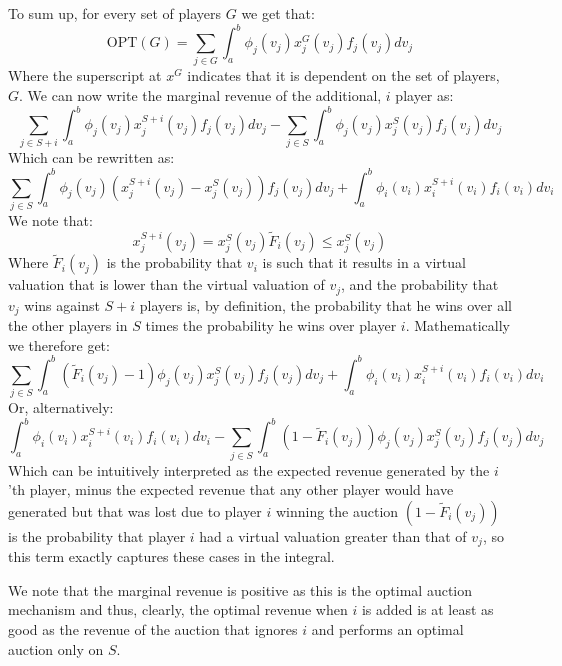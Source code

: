 \documentclass[a4page,notitlepage]{article}
\begin{document}
\begin{enumerate}
  To sum up, for every set of players $G$ we get that:
  \begin{equation*}
    \text{OPT}(G)=\sum_{j\in G}\int_a^b\phi_j(v_j)x_j^G(v_j)f_j(v_j)dv_j
  \end{equation*}
  Where the superscript at $x^G$ indicates that it is dependent on the set of players, $G$.
  We can now write the marginal revenue of the additional, $i$ player as:
  \begin{equation*}
    \sum_{j\in S+{i}}\int_a^b\phi_j(v_j)x_j^{S+{i}}(v_j)f_j(v_j)dv_j-\sum_{j\in S}\int_a^b\phi_j(v_j)x_j^S(v_j)f_j(v_j)dv_j 
  \end{equation*}
  Which can be rewritten as:
  \begin{equation*}
    \sum_{j\in S}\int_a^b\phi_j(v_j)(x_j^{S+{i}}(v_j)-x_j^S(v_j))f_j(v_j)dv_j + \int_a^b\phi_i(v_i)x_i^{S+{i}}(v_i)f_i(v_i)dv_i
  \end{equation*}
  We note that:
  \begin{equation*}
    x_j^{S+i}(v_j)=x_j^S(v_j)\tilde F_i(v_j)\leq x_j^S(v_j)
  \end{equation*}
  Where $\tilde F_i(v_j)$ is the probability that $v_i$ is such that it results in a virtual valuation that is lower than the virtual valuation of $v_j$, and the probability that $v_j$ wins against $S+i$ players is, by definition, the probability that he wins over all the other players in $S$ times the probability he wins over player $i$.
  Mathematically we therefore get:
  \begin{equation*}
    \sum_{j\in S}\int_a^b(\tilde{F}_i(v_j)-1)\phi_j(v_j)x_j^S(v_j)f_j(v_j)dv_j + \int_a^b\phi_i(v_i)x_i^{S+{i}}(v_i)f_i(v_i)dv_i
  \end{equation*}
  Or, alternatively:
  \begin{equation*}
     \int_a^b\phi_i(v_i)x_i^{S+{i}}(v_i)f_i(v_i)dv_i-\sum_{j\in S}\int_a^b(1-\tilde{F}_i(v_j))\phi_j(v_j)x_j^S(v_j)f_j(v_j)dv_j
  \end{equation*}
  Which can be intuitively interpreted as the expected revenue generated by the $i$'th player, minus the expected revenue that any other player would have generated but that was lost due to player $i$ winning the auction $(1-\tilde{F}_i(v_j))$ is the probability that player $i$ had a virtual valuation greater than that of $v_j$, so this term exactly captures these cases in the integral.

  We note that the marginal revenue is positive as this is the optimal auction mechanism and thus, clearly, the optimal revenue when $i$ is added is at least as good as the revenue of the auction that ignores $i$ and performs an optimal auction only on $S$.



\end{enumerate}
\end{document}
